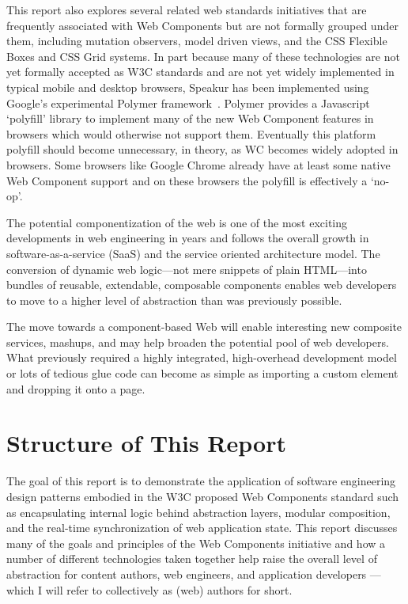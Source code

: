 This report also explores several related web standards initiatives that are frequently associated with Web Components 
but are not formally grouped under them, including mutation observers,
model driven views, 
and the CSS Flexible Boxes
and CSS Grid
systems. 
In part because many of these technologies are not yet formally accepted as W3C standards and are not yet widely implemented in typical mobile and desktop browsers, 
Speakur has been implemented using Google's experimental Polymer framework~\cite{polymercontributors2015}.
Polymer provides a Javascript `polyfill'
library to implement many of the new Web Component features in browsers which would otherwise not support them. 
Eventually this platform polyfill should become unnecessary, in theory, as WC becomes widely adopted in browsers.
Some browsers like Google Chrome 
already have at least some native Web Component support and on these browsers the polyfill is effectively a `no-op'.

The potential componentization of the web is one of the most exciting developments in web engineering in years and follows the overall growth in software-as-a-service (SaaS) 
and the service oriented architecture
model. 
The conversion of dynamic web logic---not mere snippets of plain HTML---into bundles of reusable, extendable, composable components enables web developers to move to a higher level of abstraction than was previously possible.

The move towards a component-based Web will enable interesting new composite services, mashups, and may help broaden the potential pool of web developers. 
What previously required a highly integrated, high-overhead development model or lots of tedious glue code can become as simple as importing a custom element and dropping it onto a page.


\section{Structure of This Report}
%

The goal of this report is to demonstrate the application of software engineering design patterns embodied in the W3C proposed Web Components standard such as encapsulating internal logic behind abstraction layers, modular composition, and the real-time synchronization of web application state. 
This report discusses many of the goals and principles of the Web Components initiative and how a number of different technologies taken together help raise the overall level of abstraction for content authors, web engineers, and application developers --- which I will refer to collectively as (web) authors for short.

